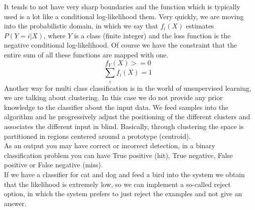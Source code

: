 It tends to not have very sharp boundaries and the function which is typically used is a lot like a conditional log-likelihood them.
Very quickly, we are moving into the probabilistic domain, in which we say that $f_i(X)$ estimates $P(Y=i|X)$, where $Y$ is a class (finite integer) and the loss function is the negative conditional log-likelihood.
Of course we have the constraint that the entire sum of all these functions are mapped with one. \[f_Y(X)>= 0\] \[\sum_{i}^{}f_i(X)=1\] 
Another way for multi class classification is in the world of unsupervised learning, we are talking about clustering. In this case we do not provide any prior knowledge to the classifier about the input data.
We feed samples into the algorithm and he progressively adjust the positioning of the different clusters and associates the different input in blind. Basically, through clustering the space is partitioned in regions centered around a prototype (centroid).
\\
As an output you may have correct or incorrect detection, in a binary classification problem you can have True positive (hit), True negative, False positive or False negative (miss).
\\
If we have a classifier for cat and dog and feed a bird into the system we obtain that the likelihood is extremely low, so we can implement a so-called reject option, in which the system prefers to just reject the examples and not give an answer. 
